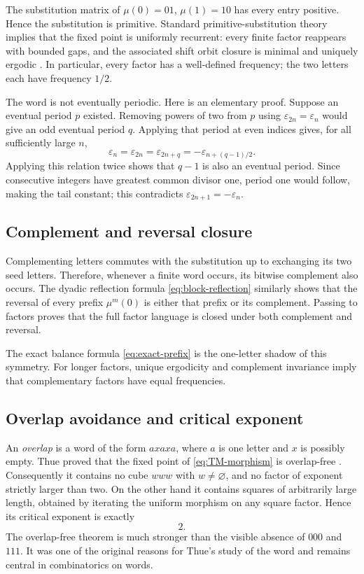 \documentclass[11pt,oneside]{article}
\theoremstyle{definition}
\theoremstyle{remark}
\newcommand{\eps}{\varepsilon}
\begin{document}
The substitution matrix of \(\mu(0)=01\), \(\mu(1)=10\) has every entry positive.  Hence the
substitution is primitive.  Standard primitive-substitution theory implies that the fixed
point is uniformly recurrent: every finite factor reappears with bounded gaps, and the
associated shift orbit closure is minimal and uniquely ergodic
\cite{queffelec2010}.  In particular, every factor has a well-defined frequency; the two
letters each have frequency \(1/2\).

The word is not eventually periodic.  Here is an elementary proof.  Suppose an eventual
period \(p\) existed.  Removing powers of two from \(p\) using
\(\eps_{2n}=\eps_n\) would give an odd eventual period \(q\).  Applying that period at even
indices gives, for all sufficiently large \(n\),
\[
  \eps_n=\eps_{2n}=\eps_{2n+q}
  =-\eps_{n+(q-1)/2}.
\]
Applying this relation twice shows that \(q-1\) is also an eventual period.  Since consecutive
integers have greatest common divisor one, period one would follow, making the tail constant;
this contradicts \(\eps_{2n+1}=-\eps_n\).

\subsection{Complement and reversal closure}

Complementing letters commutes with the substitution up to exchanging its two seed letters.
Therefore, whenever a finite word occurs, its bitwise complement also occurs.  The dyadic
reflection formula \eqref{eq:block-reflection} similarly shows that the reversal of every
prefix \(\mu^m(0)\) is either that prefix or its complement.  Passing to factors proves that
the full factor language is closed under both complement and reversal.

The exact balance formula \eqref{eq:exact-prefix} is the one-letter shadow of this symmetry.
For longer factors, unique ergodicity and complement invariance imply that complementary
factors have equal frequencies.

\subsection{Overlap avoidance and critical exponent}

An \emph{overlap} is a word of the form \(axaxa\), where \(a\) is one letter and \(x\) is
possibly empty.  Thue proved that the fixed point of \eqref{eq:TM-morphism} is overlap-free
\cite{thue1906}.  Consequently it contains no cube \(www\) with \(w\ne\varnothing\), and no
factor of exponent strictly larger than two.  On the other hand it contains squares of
arbitrarily large length, obtained by iterating the uniform morphism on any square factor.
Hence its critical exponent is exactly
\begin{equation}
  \boxed{2.}                                                \label{eq:critical-exponent}
\end{equation}
The overlap-free theorem is much stronger than the visible absence of \(000\) and \(111\).
It was one of the original reasons for Thue's study of the word and remains central in
combinatorics on words.
\end{document}
